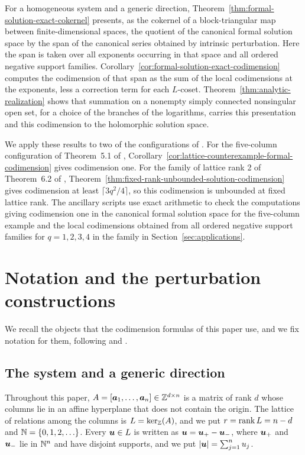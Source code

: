 For a homogeneous system and a generic direction, Theorem~\ref{thm:formal-solution-exact-cokernel} presents, as the cokernel of a block-triangular map between finite-dimensional spaces, the quotient of the canonical formal solution space by the span of the canonical series obtained by intrinsic perturbation.
Here the span is taken over all exponents occurring in that space and all ordered negative support families.
Corollary~\ref{cor:formal-solution-exact-codimension} computes the codimension of that span as the sum of the local codimensions at the exponents, less a correction term for each \(L\)-coset.
Theorem~\ref{thm:analytic-realization} shows that summation on a nonempty simply connected nonsingular open set, for a choice of the branches of the logarithms, carries this presentation and this codimension to the holomorphic solution space.

We apply these results to two of the configurations of \cite{Nak26}.
For the five-column configuration of Theorem~5.1 of \cite{Nak26}, Corollary~\ref{cor:lattice-counterexample-formal-codimension} gives codimension one.
For the family of lattice rank 2 of Theorem~6.2 of \cite{Nak26}, Theorem~\ref{thm:fixed-rank-unbounded-solution-codimension} gives codimension at least \(\lceil3q^2/4\rceil\), so this codimension is unbounded at fixed lattice rank.
\ifarxiv
The ancillary scripts use exact arithmetic to check the computations giving codimension one in the canonical formal solution space for the five-column example and the local codimensions obtained from all ordered negative support families for \(q=1,2,3,4\) in the family in Section~\ref{sec:applications}.
\fi

\section{Notation and the perturbation constructions}
\label{sec:fake-exponents}

We recall the objects that the codimension formulas of this paper use, and we fix notation for them, following \cite{GKZ89,GKZ94,Sai02,SST00} and \cite{OS25}.

\subsection{The system and a generic direction}

Throughout this paper, \(A=[\boldsymbol{a}_1,\ldots,\boldsymbol{a}_n]\in\mathbb Z^{d\times n}\) is a matrix of rank \(d\) whose columns lie in an affine hyperplane that does not contain the origin.
The lattice of relations among the columns is \(L=\ker_{\mathbb Z}(A)\), and we put \(r=\operatorname{rank} L=n-d\) and \(\mathbb N=\{0,1,2,\ldots\}\).
Every \(\boldsymbol{u}\in L\) is written as \(\boldsymbol{u}=\boldsymbol{u}_+-\boldsymbol{u}_-\), where \(\boldsymbol{u}_+\) and \(\boldsymbol{u}_-\) lie in \(\mathbb N^n\) and have disjoint supports, and we put \(|\boldsymbol{u}|=\sum_{j=1}^n u_j\).

